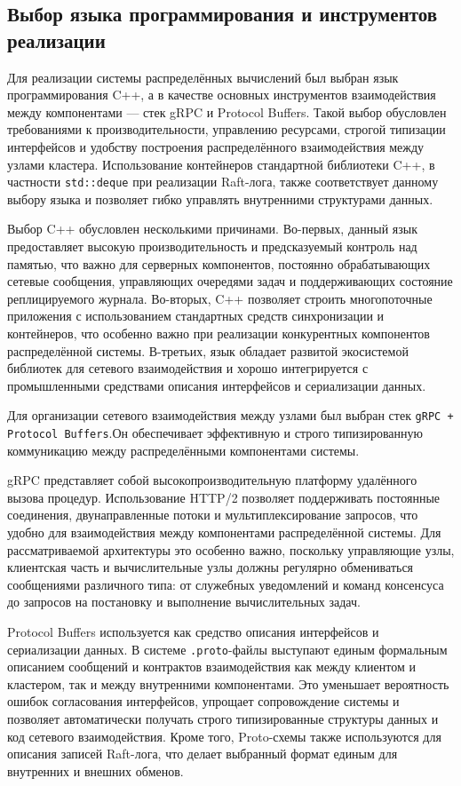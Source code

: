 \subsection{Выбор языка программирования и инструментов реализации}

Для реализации системы распределённых вычислений был выбран язык
программирования C++, а в качестве основных инструментов
взаимодействия между компонентами --- стек gRPC и Protocol
Buffers. Такой выбор обусловлен требованиями к
производительности, управлению ресурсами, строгой типизации
интерфейсов и удобству построения распределённого взаимодействия
между узлами кластера. Использование контейнеров стандартной
библиотеки C++, в частности \texttt{std::deque} при реализации
Raft-лога, также соответствует данному выбору языка и позволяет
гибко управлять внутренними структурами данных.

Выбор C++ обусловлен несколькими причинами. Во-первых, данный язык
предоставляет высокую производительность и предсказуемый контроль над памятью,
что важно для серверных компонентов, постоянно обрабатывающих сетевые
сообщения, управляющих очередями задач и поддерживающих состояние
реплицируемого журнала. Во-вторых, C++ позволяет строить многопоточные
приложения с использованием стандартных средств синхронизации и контейнеров,
что особенно важно при реализации конкурентных компонентов распределённой
системы. В-третьих, язык обладает развитой экосистемой библиотек для сетевого
взаимодействия и хорошо интегрируется с промышленными средствами описания
интерфейсов и сериализации данных.

Для организации сетевого взаимодействия между узлами был выбран стек
\texttt{gRPC + Protocol Buffers}.Он обеспечивает эффективную и строго
типизированную коммуникацию между распределёнными компонентами системы.

gRPC представляет собой высокопроизводительную платформу удалённого вызова
процедур. Использование HTTP/2 позволяет поддерживать постоянные соединения,
двунаправленные потоки и мультиплексирование запросов, что удобно для
взаимодействия между компонентами распределённой системы. Для рассматриваемой
архитектуры это особенно важно, поскольку управляющие узлы, клиентская часть и
вычислительные узлы должны регулярно обмениваться сообщениями различного типа:
от служебных уведомлений и команд консенсуса до запросов на постановку и
выполнение вычислительных задач.

Protocol Buffers используется как средство описания интерфейсов и сериализации
данных. В системе \texttt{.proto}-файлы выступают единым формальным описанием
сообщений и контрактов взаимодействия как между клиентом и кластером, так и
между внутренними компонентами. Это уменьшает вероятность ошибок согласования
интерфейсов, упрощает сопровождение системы и позволяет автоматически получать
строго типизированные структуры данных и код сетевого взаимодействия. Кроме
того, Proto-схемы также используются для описания записей Raft-лога, что делает
выбранный формат единым для внутренних и внешних обменов.

